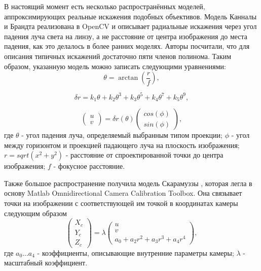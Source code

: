 В настоящий момент есть несколько распространённых моделей, аппроксимирующих реальные искажения подобных объективов. Модель Канналы и 
Брандта \cite{opencv_model} реализована в OpenCV и описывает радиальные искажения через угол падения луча света на линзу, а не расстояние  
от центра изображения до места падения, как это делалось в более ранних моделях. Авторы посчитали, что для описания типичных искажений достаточно 
пяти членов полинома. Таким образом, указанную модель можно записать следующими уравнениями:
\begin{equation}	
    \theta = \arctan(\frac{r}{f}),
    \label{eqn:kannala_theta}
\end{equation}

\begin{equation}	
    \delta r = k_1\theta + k_2\theta^3 + k_3\theta^5 + k_4\theta^7 + k_5\theta^9,
    \label{eqn:kannala_r}
\end{equation}

\begin{equation}	
    \begin{pmatrix}u\\v\end{pmatrix} = \delta r(\theta)\begin{pmatrix}cos(\phi)\\sin(\phi)\end{pmatrix},
    \label{eqn:kannala_uv}
\end{equation}
где $\theta$ - угол падения луча, определяемый выбранным типом проекции; $\phi$ - угол между горизонтом 
и проекцией падающего луча на плоскость изображения; $r = sqrt(x^2+y^2)$ - расстояние от спроектированной точки до центра
изображения; $f$ - фокусное расстояние.

Также большое распространение получила модель Скарамуззы \cite{scaramuzza}, которая легла в основу Matlab Omnidirectional 
Camera Calibration Toolbox. Она связывает точки на изображении с соответствующей им точкой в координатах камеры 
следующим образом
\begin{equation}	
    \begin{pmatrix}X_c\\Y_c\\Z_c\end{pmatrix} = \lambda \begin{pmatrix}u\\v\\a_0 + a_2 r^2 + a_3 r^3 + a_4 r^4\end{pmatrix},
    \label{eqn:scaramuzza}
\end{equation}
где $a_0 ... a_4$ - коэффициенты, описывающие внутренние параметры камеры; $\lambda$ - масштабный коэффициент.


